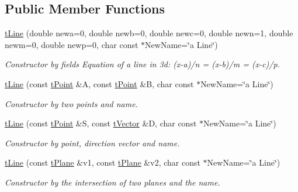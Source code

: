 \subsection*{Public Member Functions}
\begin{DoxyCompactItemize}
\item 
\hyperlink{classtLine_ab61e326194db410630307c04cbbaf301}{t\+Line} (double newa=0, double newb=0, double newc=0, double newn=1, double newm=0, double newp=0, char const $\ast$New\+Name=\char`\"{}a Line\char`\"{})
\begin{DoxyCompactList}\small\item\em Constructor by fields  Equation of a line in 3d\+: (x-\/a)/n = (x-\/b)/m = (x-\/c)/p. \end{DoxyCompactList}\item 
\mbox{\label{classtLine_a8af9012ac69b257b296c9104a6f6fda7}} 
\hyperlink{classtLine_a8af9012ac69b257b296c9104a6f6fda7}{t\+Line} (const \hyperlink{classtPoint}{t\+Point} \&A, const \hyperlink{classtPoint}{t\+Point} \&B, char const $\ast$New\+Name=\char`\"{}a Line\char`\"{})
\begin{DoxyCompactList}\small\item\em Constructor by two points and name. \end{DoxyCompactList}\item 
\mbox{\label{classtLine_a5ee3acc8febba1e9f9473be6399341c8}} 
\hyperlink{classtLine_a5ee3acc8febba1e9f9473be6399341c8}{t\+Line} (const \hyperlink{classtPoint}{t\+Point} \&S, const \hyperlink{classtVector}{t\+Vector} \&D, char const $\ast$New\+Name=\char`\"{}a Line\char`\"{})
\begin{DoxyCompactList}\small\item\em Constructor by point, direction vector and name. \end{DoxyCompactList}\item 
\mbox{\label{classtLine_a9a1dbb658383a93138ed00d8893c590b}} 
\hyperlink{classtLine_a9a1dbb658383a93138ed00d8893c590b}{t\+Line} (const \hyperlink{classtPlane}{t\+Plane} \&v1, const \hyperlink{classtPlane}{t\+Plane} \&v2, char const $\ast$New\+Name=\char`\"{}a Line\char`\"{})
\begin{DoxyCompactList}\small\item\em Constructor by the intersection of two planes and the name. \end{DoxyCompactList}\item 

\end{DoxyCompactItemize}
